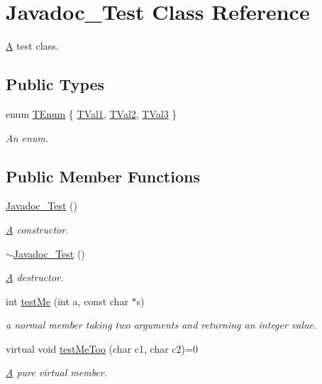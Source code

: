\hypertarget{class_javadoc___test}{}\section{Javadoc\+\_\+\+Test Class Reference}
\label{class_javadoc___test}


\mbox{\hyperlink{class_a}{A}} test class.  


\subsection*{Public Types}
\begin{DoxyCompactItemize}
\item 
enum \mbox{\hyperlink{class_javadoc___test_ae37fd1cbf1af522674cbd33873b786a6}{T\+Enum}} \{ \mbox{\hyperlink{class_javadoc___test_ae37fd1cbf1af522674cbd33873b786a6a90f0d8d4f07a79342261fb1c191af72b}{T\+Val1}}, 
\mbox{\hyperlink{class_javadoc___test_ae37fd1cbf1af522674cbd33873b786a6a5954e696a652f442d7255af4e0d35d61}{T\+Val2}}, 
\mbox{\hyperlink{class_javadoc___test_ae37fd1cbf1af522674cbd33873b786a6ab4a4dc16e1050c9604cf5c46a51e5a8e}{T\+Val3}}
 \}
\begin{DoxyCompactList}\small\item\em An enum. \end{DoxyCompactList}\end{DoxyCompactItemize}
\subsection*{Public Member Functions}
\begin{DoxyCompactItemize}
\item 
\mbox{\hyperlink{class_javadoc___test_a17313327932ae97596b0a455ba8342cc}{Javadoc\+\_\+\+Test}} ()
\begin{DoxyCompactList}\small\item\em \mbox{\hyperlink{class_a}{A}} constructor. \end{DoxyCompactList}\item 
\mbox{\hyperlink{class_javadoc___test_a60016cd15a4ed82bbc35be79a0a6a6b5}{$\sim$\+Javadoc\+\_\+\+Test}} ()
\begin{DoxyCompactList}\small\item\em \mbox{\hyperlink{class_a}{A}} destructor. \end{DoxyCompactList}\item 
int \mbox{\hyperlink{class_javadoc___test_a0c472683ed25ff096e8a9edfb18d550c}{test\+Me}} (int a, const char $\ast$s)
\begin{DoxyCompactList}\small\item\em a normal member taking two arguments and returning an integer value. \end{DoxyCompactList}\item 
virtual void \mbox{\hyperlink{class_javadoc___test_ac2b39cabbe80957ae3e8bc2bd4e887f6}{test\+Me\+Too}} (char c1, char c2)=0
\begin{DoxyCompactList}\small\item\em \mbox{\hyperlink{class_a}{A}} pure virtual member. \end{DoxyCompactList}\end{DoxyCompactItemize}
